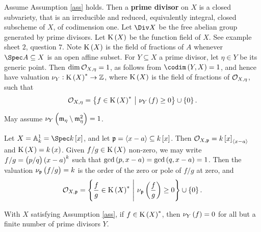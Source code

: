 \begin{definition*}
Assume Assumption \ref{ass} holds. Then a \textbf{prime divisor} on $ X $ is a closed subvariety, that is an irreducible and reduced, equivalently integral, closed subscheme of $ X $, of codimension one. Let $ \Div X $ be the free abelian group generated by prime divisors. Let $ \K\br{X} $ be the function field of $ X $. See example sheet $ 2 $, question $ 7 $. Note $ \K\br{X} $ is the field of fractions of $ A $ whenever $ \Spec A \subseteq X $ is an open affine subset. For $ Y \subseteq X $ a prime divisor, let $ \eta \in Y $ be its generic point. Then $ \dim \mathcal{O}_{X, \eta} = 1 $, as follows from $ \codim\br{Y, X} = 1 $, and hence have valuation $ \nu_Y : \K\br{X}^* \to \ZZ $, where $ \K\br{X} $ is the field of fractions of $ \mathcal{O}_{X, \eta} $, such that
$$ \OOO_{X, \eta} = \cbr{f \in \K\br{X}^* \st \nu_Y\br{f} \ge 0} \cup \cbr{0}. $$
\end{definition*}

May assume $ \nu_Y\br{\mmm_\eta \setminus \mmm_\eta^2} = 1 $.

\begin{example*}
Let $ X = \AA_k^1 = \Spec k\sbr{x} $, and let $ \ppp = \abr{x - a} \subseteq k\sbr{x} $. Then $ \OOO_{X, \ppp} = k\sbr{x}_{\abr{x - a}} $ and $ \K\br{X} = k\br{x} $. Given $ f / g \in \K\br{X} $ non-zero, we may write $ f / g = \br{p / q}\br{x - a}^k $ such that $ \gcd\br{p, x - a} = \gcd\br{q, x - a} = 1 $. Then the valuation $ \nu_\ppp\br{f / g} = k $ is the order of the zero or pole of $ f / g $ at zero, and
$$ \OOO_{X, \ppp} = \cbr{\dfrac{f}{g} \in \K\br{X}^* \st \nu_\ppp\br{\dfrac{f}{g}} \ge 0} \cup \cbr{0}. $$
\end{example*}

\begin{lemma}
\label{lem:primedivisor}
With $ X $ satisfying Assumption \ref{ass}, if $ f \in \K\br{X}^* $, then $ \nu_Y\br{f} = 0 $ for all but a finite number of prime divisors $ Y $.
\end{lemma}

